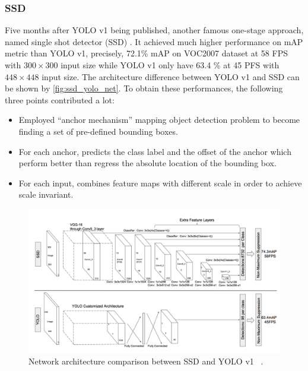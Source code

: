 \subsubsection{SSD}

Five months after YOLO v1 being published, another famous one-stage approach,
named single shot detector (SSD) \cite{ssd-paper-2015}. 
It achieved much higher performance on mAP metric than YOLO v1, precisely, 
72.1\% mAP on VOC2007 dataset at 58 FPS with $300 \times 300$ input size while 
YOLO v1 only have 63.4 \% at 45 PFS with
$448 \times 448$ input size. The architecture difference between YOLO v1 and 
SSD can be shown by \autoref{fig:ssd_yolo_net}.
To obtain these performances, the following three points contributed a lot:

\begin{itemize}
    \item Employed ``anchor mechanism'' mapping object detection problem to 
    become finding a set of pre-defined bounding boxes.

    \item For each anchor, predicts the class label and the offset of the
    anchor which perform better than regress the absolute location of the 
    bounding box.

	\item For each input, combines feature maps with different scale in order to
    achieve scale invariant.
\end{itemize}

\begin{figure}
    \includegraphics[width=\linewidth]{figures/ssd_yolo_net_arch.png}
    \caption{Network architecture comparison between SSD and YOLO v1
    ~\protect\cite{ssd-paper-2015}.}
    \label{fig:ssd_yolo_net}
\end{figure}

